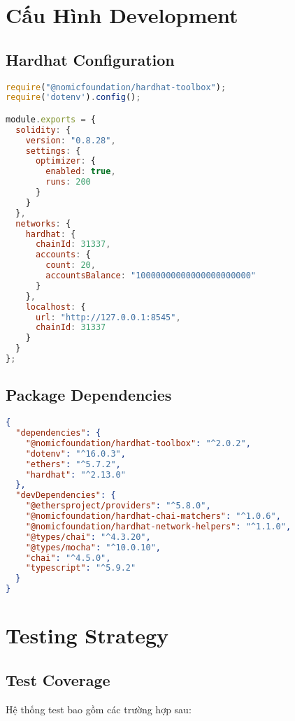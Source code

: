 \documentclass[12pt,a4paper]{article}
\begin{document}
\section{Cấu Hình Development}

\subsection{Hardhat Configuration}
\begin{lstlisting}[language=JavaScript, caption=hardhat.config.js]
require("@nomicfoundation/hardhat-toolbox");
require('dotenv').config();

module.exports = {
  solidity: {
    version: "0.8.28",
    settings: {
      optimizer: {
        enabled: true,
        runs: 200
      }
    }
  },
  networks: {
    hardhat: {
      chainId: 31337,
      accounts: {
        count: 20,
        accountsBalance: "10000000000000000000000"
      }
    },
    localhost: {
      url: "http://127.0.0.1:8545",
      chainId: 31337
    }
  }
};
\end{lstlisting}

\subsection{Package Dependencies}
\begin{lstlisting}[language=JSON, caption=Các thư viện cần thiết]
{
  "dependencies": {
    "@nomicfoundation/hardhat-toolbox": "^2.0.2",
    "dotenv": "^16.0.3",
    "ethers": "^5.7.2",
    "hardhat": "^2.13.0"
  },
  "devDependencies": {
    "@ethersproject/providers": "^5.8.0",
    "@nomicfoundation/hardhat-chai-matchers": "^1.0.6",
    "@nomicfoundation/hardhat-network-helpers": "^1.1.0",
    "@types/chai": "^4.3.20",
    "@types/mocha": "^10.0.10",
    "chai": "^4.5.0",
    "typescript": "^5.9.2"
  }
}
\end{lstlisting}

\section{Testing Strategy}

\subsection{Test Coverage}
Hệ thống test bao gồm các trường hợp sau:
\end{document}
